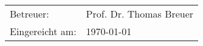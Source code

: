 \begin{titlepage}
\begin{Large}
\begin{flushleft}
\begin{tabular}{ll}
Betreuer: & Prof. Dr. Thomas Breuer \\
Eingereicht am: & \today
\end{tabular} 
\end{flushleft}
\end{Large}
\end{titlepage}

